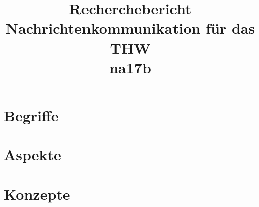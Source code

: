 \documentclass[a4paper,11pt,oneside, titlepage]{article}
\title{Recherchebericht\\Nachrichtenkommunikation für das THW \\ na17b}
\date{}
\begin{document}
\maketitle
\tableofcontents
\newpage
\section{Begriffe}














\section{Aspekte}








\section{Konzepte}








\end{document}
